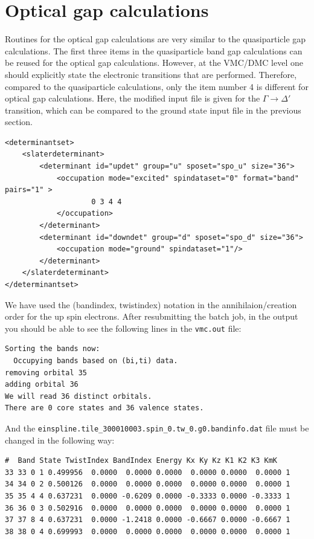 \section{Optical gap calculations}
Routines for the optical gap calculations are very similar to the quasiparticle gap calculations. 
The first three items in the quasiparticle band gap calculations can be reused for the optical gap calculations. 
However, at the VMC/DMC level one should explicitly state the electronic transitions that are performed. 
Therefore, compared to the quasiparticle calculations, only the item number 4 is different for optical gap calculations. 
Here, the modified input file is given for the $\Gamma\rightarrow\Delta'$ transition, which can be compared to the ground state input file in the previous section. 
\begin{lstlisting}
<determinantset>
	<slaterdeterminant>
		<determinant id="updet" group="u" sposet="spo_u" size="36">
		    <occupation mode="excited" spindataset="0" format="band" pairs="1" >
					0 3 4 4
		    </occupation>
		</determinant>
		<determinant id="downdet" group="d" sposet="spo_d" size="36">
		    <occupation mode="ground" spindataset="1"/>	
		</determinant>
	</slaterdeterminant>
</determinantset>
\end{lstlisting}
We have used the (bandindex, twistindex) notation in the annihilaion/creation order for the up spin electrons. 
After resubmitting the batch job, in the output you should be able to see the following lines in the \texttt{vmc.out} file:
\begin{lstlisting}
Sorting the bands now:
  Occupying bands based on (bi,ti) data.
removing orbital 35
adding orbital 36
We will read 36 distinct orbitals.
There are 0 core states and 36 valence states.
\end{lstlisting}
And the \texttt{einspline.tile\_300010003.spin\_0.tw\_0.g0.bandinfo.dat} file must be changed in the following way: 
\begin{lstlisting}
#  Band State TwistIndex BandIndex Energy Kx Ky Kz K1 K2 K3 KmK
33 33 0	1 0.499956	0.0000  0.0000 0.0000  0.0000 0.0000  0.0000 1
34 34 0	2 0.500126	0.0000  0.0000 0.0000  0.0000 0.0000  0.0000 1
35 35 4	4 0.637231	0.0000 -0.6209 0.0000 -0.3333 0.0000 -0.3333 1
36 36 0	3 0.502916	0.0000  0.0000 0.0000  0.0000 0.0000  0.0000 1
37 37 8	4 0.637231	0.0000 -1.2418 0.0000 -0.6667 0.0000 -0.6667 1
38 38 0	4 0.699993	0.0000  0.0000 0.0000  0.0000 0.0000  0.0000 1
\end{lstlisting}
